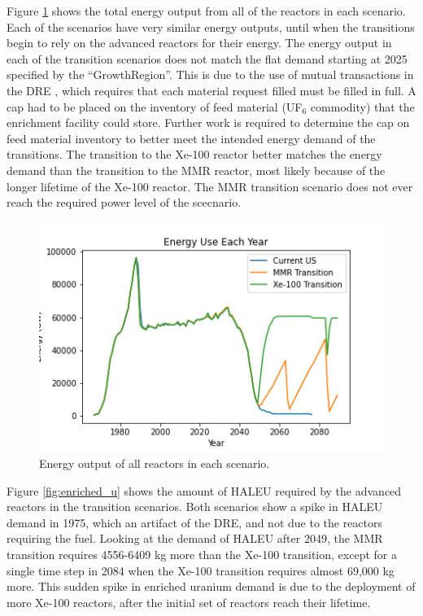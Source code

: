 Figure \ref{fig:energy} shows the total energy output from 
all of the reactors in each scenario. Each of the scenarios
have very similar energy outputs, until  when the transitions 
begin to rely on the advanced reactors for their energy.
The energy output in 
each of the transition scenarios does not match the flat demand 
starting at 2025 specified by the \Cycamore ``GrowthRegion''. 
This is due to 
the use of mutual transactions in the \gls{DRE} 
\cite{gidden_methodology_2016}, which requires that each 
material request filled must be filled in full. A cap had to be 
placed on the inventory of feed material (UF$_6$ commodity) that 
the enrichment facility could store. Further work is required 
to determine the cap on feed material inventory to better meet 
the intended energy demand of the transitions. The transition to 
the Xe-100 reactor better matches the energy demand than the 
transition to the \gls{MMR} reactor, most likely because of the 
longer lifetime of the Xe-100 reactor. The \gls{MMR} transition 
scenario does not ever reach the required power level of 
the scecnario. 

\begin{figure}[ht]
    \centering
    \includegraphics[scale=0.5]{figures/energy_all.png}
    \caption{Energy output of all reactors in each scenario.}
    \label{fig:energy}
\end{figure}

Figure \ref{fig:enriched_u} shows the amount of \gls{HALEU} 
required by the advanced reactors in the transition scenarios. 
Both scenarios show a spike in \gls{HALEU} demand in 1975, which 
an artifact of the \gls{DRE}, and not due to the reactors requiring the 
fuel. Looking at the demand of \gls{HALEU} after 2049, the 
\gls{MMR} transition requires 4556-6409 kg more than the 
Xe-100 transition, except for a single time step in 2084 when 
the Xe-100 transition requires almost 69,000 kg more. This 
sudden spike in enriched uranium demand is due to the 
deployment of more Xe-100 reactors, after the initial set 
of reactors reach their lifetime. 

